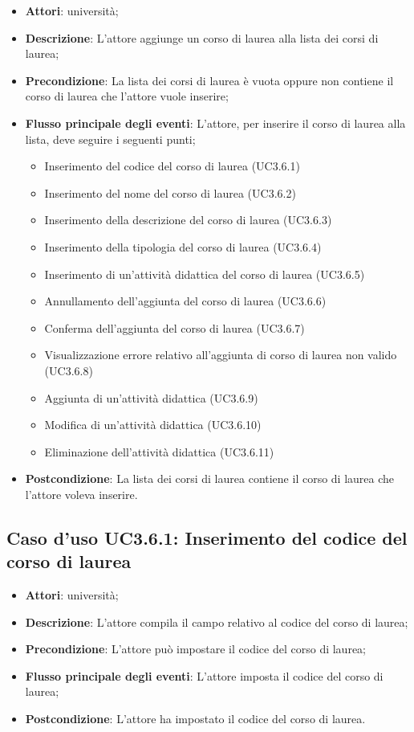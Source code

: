 \begin{itemize}
\item \textbf{Attori}: università;
\item \textbf{Descrizione}: L'attore aggiunge un corso di laurea alla lista dei corsi di laurea;
\item \textbf{Precondizione}: La lista dei corsi di laurea è vuota oppure non contiene il corso di laurea che l'attore vuole inserire;
\item \textbf{Flusso principale degli eventi}: L'attore, per inserire il corso di laurea alla lista, deve seguire i seguenti punti; 
\begin{itemize}
\item Inserimento del codice del corso di laurea (UC3.6.1)
\item Inserimento del nome del corso di laurea (UC3.6.2)
\item Inserimento della descrizione del corso di laurea (UC3.6.3)
\item Inserimento della tipologia del corso di laurea (UC3.6.4)
\item Inserimento di un'attività didattica del corso di laurea (UC3.6.5)
\item Annullamento dell'aggiunta del corso di laurea (UC3.6.6)
\item Conferma dell’aggiunta del corso di laurea (UC3.6.7)
\item Visualizzazione errore relativo all’aggiunta di corso di laurea non valido  (UC3.6.8)
\item Aggiunta di un'attività didattica (UC3.6.9)
\item Modifica di un'attività didattica (UC3.6.10)
\item Eliminazione dell’attività didattica (UC3.6.11)
\end{itemize}
\item \textbf{Postcondizione}: La lista dei corsi di laurea contiene il corso di laurea che l'attore voleva inserire.
\end{itemize}
\subsection{Caso d'uso \texorpdfstring{UC3.6.1}{UC3.6.1}: Inserimento del codice del corso di laurea}
\begin{itemize}
\item \textbf{Attori}: università;
\item \textbf{Descrizione}: L'attore compila il campo relativo al codice del corso di laurea;
\item \textbf{Precondizione}: L'attore può impostare il codice del corso di laurea;
\item \textbf{Flusso principale degli eventi}: L'attore imposta il codice del corso di laurea;
\item \textbf{Postcondizione}: L'attore ha impostato il codice del corso di laurea.
\end{itemize}
